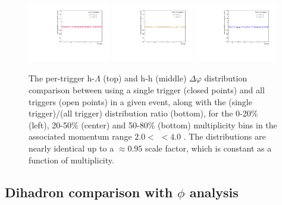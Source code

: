 \begin{figure}[ht]
    \includegraphics[width=0.32\textwidth]{figures/analysis/singletrigger_ratio_0_20.pdf}
    \includegraphics[width=0.32\textwidth]{figures/analysis/singletrigger_ratio_20_50.pdf}
    \includegraphics[width=0.32\textwidth]{figures/analysis/singletrigger_ratio_50_80.pdf}
    \caption{The per-trigger h-$\Lambda$ (top) and h-h (middle) $\Delta\varphi$ distribution comparison between using a single trigger (closed points) and all triggers (open points) in a given event, along with the (single trigger)/(all trigger) distribution ratio (bottom), for the 0-20\% (left), 20-50\% (center) and 50-80\% (bottom) multiplicity bins in the associated momentum range $2.0 <$ \pt $< 4.0$ \GeVc. The distributions are nearly identical up to a $\approx 0.95$ scale factor, which is constant as a function of multiplicity.}
    \label{fig:single_trigger_comp}
\end{figure}

\clearpage

\subsection{Dihadron comparison with $\phi$ analysis}
\label{sec:dihadron_comparison}

